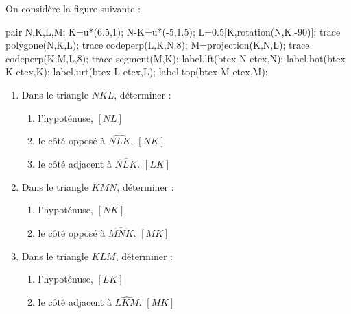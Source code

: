 \begin{corrige}
    On considère la figure suivante :

    \begin{Geometrie}[CoinHD={(7.5u,4.5u)}]        
        pair N,K,L,M;
        K=u*(6.5,1);
        N-K=u*(-5,1.5);
        L=0.5[K,rotation(N,K,-90)];
        trace polygone(N,K,L);            
        trace codeperp(L,K,N,8);
        M=projection(K,N,L);
        trace codeperp(K,M,L,8);
        trace segment(M,K);
        label.lft(btex N etex,N);
        label.bot(btex  K etex,K);
        label.urt(btex L etex,L);
        label.top(btex M etex,M);
    \end{Geometrie}

    \begin{enumerate}
        \item Dans le triangle $NKL$, déterminer :
        \begin{enumerate}
            \item l'hypoténuse, {\red  $[NL]$}
            \item le côté opposé à $\widehat{NLK}$, {\red  $[NK]$}
            \item le côté adjacent à $\widehat{NLK}$. {\red  $[LK]$}
        \end{enumerate}
        \setcounter{enumi}{1}
        \item Dans le triangle $KMN$, déterminer :
        \begin{enumerate}
            \item l'hypoténuse, {\red  $[NK]$}
            \item le côté opposé à $\widehat{MNK}$. {\red  $[MK]$}
        \end{enumerate} 
        \setcounter{enumi}{2}
        \item Dans le triangle $KLM$, déterminer :
        \begin{enumerate}
            \item l'hypoténuse, {\red  $[LK]$}
            \item le côté adjacent à $\widehat{LKM}$. {\red  $[MK]$}
        \end{enumerate}             
    \end{enumerate}
\end{corrige}

